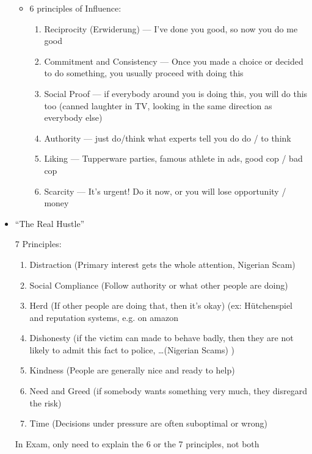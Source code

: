 \documentclass[a4paper,12pt]{scrartcl}
\begin{document}
\begin{itemize}
\begin{itemize}
			\item
				6 principles of Influence:
				\begin{enumerate}
					\item
						Reciprocity (Erwiderung) --- I've done you good, so now you do me good
					\item
						Commitment and Consistency --- Once you made a choice or decided to do something, you usually proceed with doing this
					\item
						Social Proof --- if everybody around you is doing this, you will do this too (canned laughter in TV, looking in the same direction as everybody else)
					\item
						Authority --- just do/think what experts tell you do do / to think
					\item
						Liking --- Tupperware parties, famous athlete in ads, good cop / bad cop
					\item
						Scarcity --- It's urgent! Do it now, or you will lose opportunity / money
				\end{enumerate}
		\end{itemize}
	\item
		\enquote{The Real Hustle}

		7 Principles:
		\begin{enumerate}
			\item
				Distraction (Primary interest gets the whole attention, Nigerian Scam)
			\item
				Social Compliance (Follow authority or what other people are doing)
			\item
				Herd (If other people are doing that, then it's okay) (ex: Hütchenspiel and reputation systems, e.g. on amazon
			\item
				Dishonesty (if the victim can made to behave badly, then they are not likely to admit this fact to police, \dots (Nigerian Scams) )
			\item
				Kindness (People are generally nice and ready to help)
			\item
				Need and Greed (if somebody wants something very much, they disregard the risk)
			\item
				Time (Decisions under pressure are often suboptimal or wrong)
		\end{enumerate}

		In Exam, only need to explain the 6 or the 7 principles, not both
\end{itemize}
\end{document}
